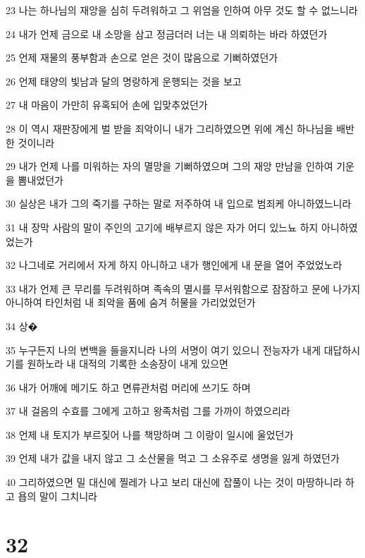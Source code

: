 \par 23 나는 하나님의 재앙을 심히 두려워하고 그 위엄을 인하여 아무 것도 할 수 없느니라
\par 24 내가 언제 금으로 내 소망을 삼고 정금더러 너는 내 의뢰하는 바라 하였던가
\par 25 언제 재물의 풍부함과 손으로 얻은 것이 많음으로 기뻐하였던가
\par 26 언제 태양의 빛남과 달의 명랑하게 운행되는 것을 보고
\par 27 내 마음이 가만히 유혹되어 손에 입맞추었던가
\par 28 이 역시 재판장에게 벌 받을 죄악이니 내가 그리하였으면 위에 계신 하나님을 배반한 것이니라
\par 29 내가 언제 나를 미워하는 자의 멸망을 기뻐하였으며 그의 재앙 만남을 인하여 기운을 뽐내었던가
\par 30 실상은 내가 그의 죽기를 구하는 말로 저주하여 내 입으로 범죄케 아니하였느니라
\par 31 내 장막 사람의 말이 주인의 고기에 배부르지 않은 자가 어디 있느뇨 하지 아니하였었는가
\par 32 나그네로 거리에서 자게 하지 아니하고 내가 행인에게 내 문을 열어 주었었노라
\par 33 내가 언제 큰 무리를 두려워하며 족속의 멸시를 무서워함으로 잠잠하고 문에 나가지 아니하여 타인처럼 내 죄악을 품에 숨겨 허물을 가리었었던가
\par 34 상�
\par 35 누구든지 나의 변백을 들을지니라 나의 서명이 여기 있으니 전능자가 내게 대답하시기를 원하노라 내 대적의 기록한 소송장이 내게 있으면
\par 36 내가 어깨에 메기도 하고 면류관처럼 머리에 쓰기도 하며
\par 37 내 걸음의 수효를 그에게 고하고 왕족처럼 그를 가까이 하였으리라
\par 38 언제 내 토지가 부르짖어 나를 책망하며 그 이랑이 일시에 울었던가
\par 39 언제 내가 값을 내지 않고 그 소산물을 먹고 그 소유주로 생명을 잃게 하였던가
\par 40 그리하였으면 밀 대신에 찔레가 나고 보리 대신에 잡풀이 나는 것이 마땅하니라 하고 욥의 말이 그치니라

\chapter{32}

